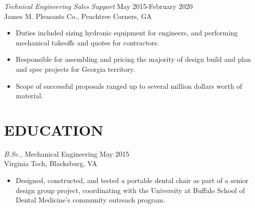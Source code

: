 \documentclass[margin]{res}
\begin{document}
\begin{resume}
    {\sl Technical Engineering Sales Support} \hfill May 2015-February 2020 \\
        James M. Pleasants Co., Peachtree Corners, GA
        \begin{itemize}  \itemsep -2pt %
            \item Duties included sizing hydronic equipment for engineers, and performing mechanical takeoffs and quotes for contractors.
            \item Responsible for assembling and pricing the majority of design build and plan and spec projects for Georgia territory.
            \item Scope of successful proposals ranged up to several million dollars worth of material.
            \end{itemize}
 

\section{EDUCATION} {\sl B.Sc.,} Mechanical Engineering \hfill  May 2015 \\
    Virginia Tech, Blacksburg, VA
    \begin{itemize}  \itemsep -2pt %
        \item Designed, constructed, and tested a portable dental chair as part of a senior design group project, coordinating with the University at Buffalo School of Dental Medicine's community outreach program.
    \end{itemize}
 
 


\end{resume}
\end{document}
